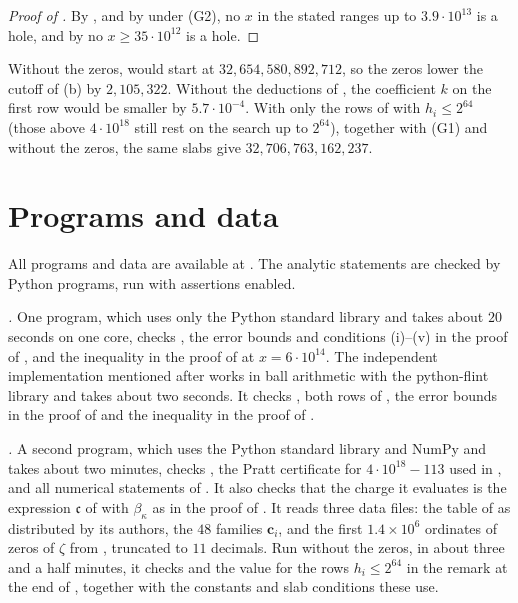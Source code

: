 \documentclass[11pt,colorlinks]{charlie}
\begin{document}
\begin{proof}[Proof of ]
By , and by  under (G2), no $x$ in the stated ranges up to $3.9\cdot10^{13}$ is a hole, and by  no $x\ge35\cdot10^{12}$ is a hole.
\end{proof}

\begin{remark}\label{rem:inputs}
Without the zeros,  would start at $32{,}654{,}580{,}892{,}712$, so the zeros lower the cutoff of (b) by $2{,}105{,}322$. Without the deductions of , the coefficient $k$ on the first row would be smaller by $5.7\cdot10^{-4}$. With only the rows of  with $h_i\le2^{64}$ (those above $4\cdot10^{18}$ still rest on the search up to $2^{64}$), together with (G1) and without the zeros, the same slabs give $32{,}706{,}763{,}162{,}237$.
\end{remark}

\section{Programs and data}\label{app:programs}
All programs and data are available at \coderepo. The analytic statements are checked by Python programs, run with assertions enabled.

\emph{.} One program, which uses only the Python standard library and takes about $20$ seconds on one core, checks , the error bounds and conditions (i)--(v) in the proof of , and the inequality in the proof of  at $x=6\cdot10^{14}$. The independent implementation mentioned after  works in ball arithmetic with the python-flint library and takes about two seconds. It checks , both rows of , the error bounds in the proof of  and the inequality in the proof of .

\emph{.} A second program, which uses the Python standard library and NumPy and takes about two minutes, checks , the Pratt certificate for $4\cdot10^{18}-113$ used in , and all numerical statements of . It also checks that the charge it evaluates is the expression $\mathfrak c$ of  with $\beta_\kappa$ as in the proof of . It reads three data files: the table of \cite{OeSHP} as distributed by its authors, the $48$ families $\mathbf c_i$, and the first $1.4\times10^6$ ordinates of zeros of $\zeta$ from \cite{LMFDB}, truncated to $11$ decimals. Run without the zeros, in about three and a half minutes, it checks  and the value for the rows $h_i\le2^{64}$ in the remark at the end of , together with the constants and slab conditions these use.
\end{document}
